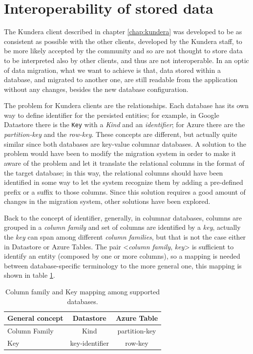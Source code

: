 
\section{Interoperability of stored data}
\label{sec:data-interoperability}
The Kundera client described in chapter \ref{chap:kundera} was developed to be as consistent as possible with the other clients, developed by the Kundera staff, to be more likely accepted by the community and so are not thought to store data to be interpreted also by other clients, and thus are not interoperable.
In an optic of data migration, what we want to achieve is that, data stored within a database, and migrated to another one, are still readable from the application without any changes, besides the new database configuration. 

\noindent The problem for Kundera clients are the relationships. Each database has its own way to define identifier for the persisted entities; for example, in Google Datastore there is the \texttt{Key} with a \textit{Kind} and an \textit{identifier}; for Azure there are the \textit{partition-key} and the \textit{row-key}. These concepts are different, but actually quite similar since both databases are key-value columnar databases. 
A solution to the problem would have been to modify the migration system in order to make it aware of the problem and let it translate the relational columns in the format of the target database; in this way, the relational columns should have been identified in some way to let the system recognize them by adding a pre-defined prefix or a suffix to those columns.
Since this solution requires a good amount of changes in the migration system, other solutions have been explored.
 
\newparagraph Back to the concept of identifier, generally, in columnar databases, columns are grouped in a \textit{column family} and set of columns are identified by a \textit{key}, actually the \textit{key} can span among different \textit{column families}, but that is not the case either in Datastore or Azure Tables.
The pair \textless\textit{column family}, \textit{key}\textgreater{} is sufficient to identify an entity (composed by one or more columns), so a mapping is needed between database-specific terminology to the more general one, this mapping is shown in table \ref{table:mapping}.

\begin{table}[h]
\centering
\vspace{1em}
\renewcommand{\arraystretch}{1.4}
\begin{tabular}{lcc}
\hline
\textbf{General concept} & \textbf{Datastore} & \textbf{Azure Table}\\ 
\hline\hline
Column Family & Kind & partition-key \\
\hline
Key & key-identifier & row-key \\
\hline
\end{tabular}
\caption{Column family and Key mapping among supported databases.}
\label{table:mapping}
\end{table}

